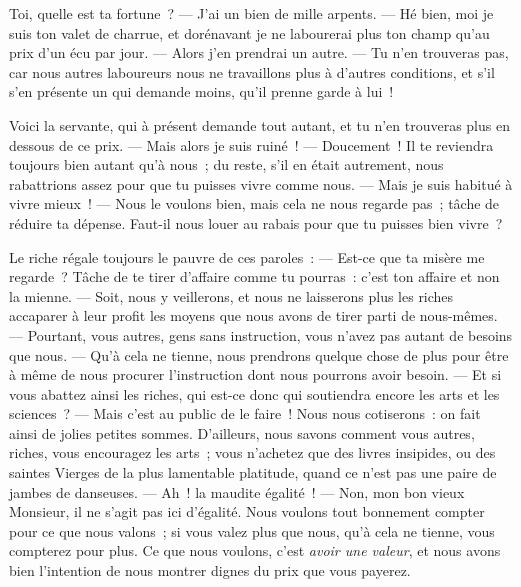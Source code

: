\documentclass[french,twoside]{book} %
\begin{document}
Toi, quelle est ta fortune ? — J’ai un bien de  mille arpents. — Hé bien, moi je suis ton valet de charrue, et dorénavant je ne labourerai plus ton champ qu’au prix d’un écu par jour. — Alors j’en prendrai un autre. — Tu n’en trouveras pas, car nous autres laboureurs nous ne travaillons plus à d’autres conditions, et s’il s’en présente un qui demande moins, qu’il prenne garde à lui !\par
Voici la servante, qui à présent demande tout autant, et tu n’en trouveras plus en dessous de ce prix. — Mais alors je suis ruiné ! — Doucement ! Il te reviendra toujours bien autant qu’à nous ; du reste, s’il en était autrement, nous rabattrions assez pour que tu puisses vivre comme nous. — Mais je suis habitué à vivre mieux ! — Nous le voulons bien, mais cela ne nous regarde pas ; tâche de réduire ta dépense. Faut-il nous louer au rabais pour que tu puisses bien vivre ?\par
Le riche régale toujours le pauvre de ces paroles : — Est-ce que ta misère me regarde ? Tâche de te tirer d’affaire comme tu pourras : c’est ton affaire et non la mienne. — Soit, nous y veillerons, et nous ne laisserons plus les riches accaparer à leur profit les moyens que nous avons de tirer parti de nous-mêmes. — Pourtant, vous autres, gens sans instruction, vous n’avez pas autant de besoins que nous. — Qu’à cela ne tienne, nous prendrons quelque chose de plus pour être à même de nous procurer l’instruction dont nous pourrons avoir besoin. — Et si vous abattez ainsi les riches, qui est-ce donc qui soutiendra encore les arts et les sciences ? — Mais c’est au public de le faire ! Nous nous cotiserons : on fait ainsi de jolies petites sommes. D’ailleurs, nous savons comment vous autres, riches, vous encouragez les arts ; vous n’achetez que des livres insipides, ou des saintes Vierges de la plus lamentable platitude, quand ce n’est pas une paire de jambes de danseuses. — Ah ! la maudite égalité ! — Non, mon bon vieux Monsieur, il ne s’agit pas ici d’égalité. Nous voulons  tout bonnement compter pour ce que nous valons ; si vous valez plus que nous, qu’à cela ne tienne, vous compterez pour plus. Ce que nous voulons, c’est \emph{avoir une valeur}, et nous avons bien l’intention de nous montrer dignes du prix que vous payerez.\par
\end{document}
